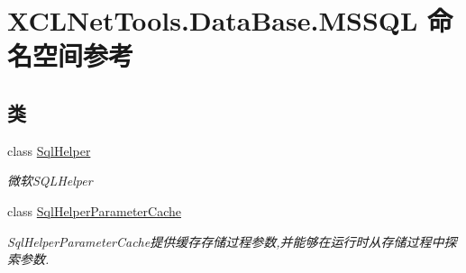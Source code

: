 \hypertarget{namespace_x_c_l_net_tools_1_1_data_base_1_1_m_s_s_q_l}{}\section{X\+C\+L\+Net\+Tools.\+Data\+Base.\+M\+S\+S\+QL 命名空间参考}
\label{namespace_x_c_l_net_tools_1_1_data_base_1_1_m_s_s_q_l}
\subsection*{类}
\begin{DoxyCompactItemize}
\item 
class \hyperlink{class_x_c_l_net_tools_1_1_data_base_1_1_m_s_s_q_l_1_1_sql_helper}{Sql\+Helper}
\begin{DoxyCompactList}\small\item\em 微软\+S\+Q\+L\+Helper \end{DoxyCompactList}\item 
class \hyperlink{class_x_c_l_net_tools_1_1_data_base_1_1_m_s_s_q_l_1_1_sql_helper_parameter_cache}{Sql\+Helper\+Parameter\+Cache}
\begin{DoxyCompactList}\small\item\em Sql\+Helper\+Parameter\+Cache提供缓存存储过程参数,并能够在运行时从存储过程中探索参数. \end{DoxyCompactList}\end{DoxyCompactItemize}
